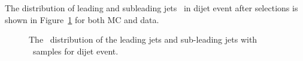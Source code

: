 The distribution of leading and subleading jets \pt~in dijet event after selections is shown in Figure~\ref{fig:QG-2samplePt} for both MC and data.




\begin{figure}[htb]
        \centering
         \quad
         \quad
        \caption[]{
	  The \pt~distribution of the leading jets and sub-leading jets with \pythia~samples for dijet event.
                \label{fig:QG-2samplePt}
        }
\end{figure}




